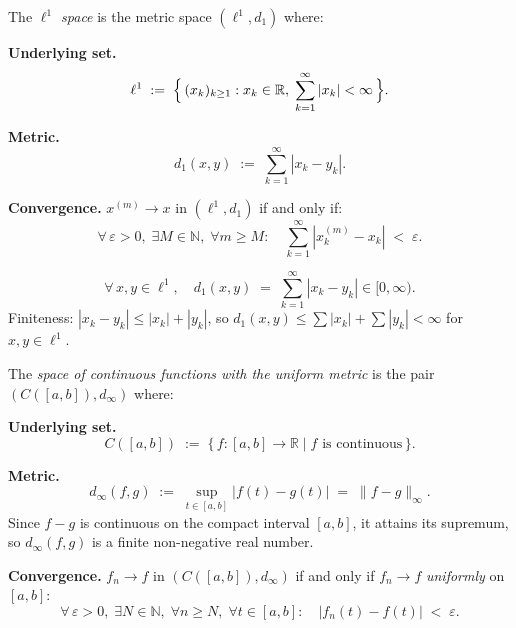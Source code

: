 \begin{tcolorbox}[colback=propbox, colframe=propborder, arc=2pt,
  left=6pt, right=6pt, top=4pt, bottom=4pt,
  title={\small\textbf{Definition ($\ell^1$ — Absolutely Summable Sequence Space)}},
  fonttitle=\small\bfseries]
\begin{definition}
\label{def:ell1}
The \emph{$\ell^1$ space} is the metric space $(\ell^1, d_1)$ where:

\medskip
\noindent\textbf{Underlying set.}
\[
\ell^1 \;:=\; \Bigl\{\,(x_k)_{k \ge 1} : x_k \in \mathbb{R},\;
\sum_{k=1}^\infty |x_k| < \infty\,\Bigr\}.
\]

\medskip
\noindent\textbf{Metric.}
\[
d_1(x,y) \;:=\; \sum_{k=1}^\infty |x_k - y_k|.
\]

\medskip
\noindent\textbf{Convergence.}\quad
$x^{(m)} \to x$ in $(\ell^1, d_1)$ if and only if:
\[
\forall\,\varepsilon > 0,\;\exists M \in \mathbb{N},\;
\forall m \ge M:\quad
\sum_{k=1}^\infty |x^{(m)}_k - x_k| \;<\; \varepsilon.
\]
\end{definition}
\end{tcolorbox}

\begin{remark*}
\[
\forall\, x, y \in \ell^1, \quad
d_1(x,y) \;=\; \sum_{k=1}^\infty |x_k - y_k| \in [0,\infty).
\]
Finiteness: $|x_k - y_k| \le |x_k| + |y_k|$, so
$d_1(x,y) \le \sum|x_k| + \sum|y_k| < \infty$ for $x, y \in \ell^1$.
\end{remark*}


\begin{tcolorbox}[colback=propbox, colframe=propborder, arc=2pt,
  left=6pt, right=6pt, top=4pt, bottom=4pt,
  title={\small\textbf{Definition ($C([a,b])$ with the Uniform Metric)}},
  fonttitle=\small\bfseries]
\begin{definition}
\label{def:cont-uniform}
The \emph{space of continuous functions with the uniform metric} is the pair
$(C([a,b]), d_\infty)$ where:

\medskip
\noindent\textbf{Underlying set.}
\[
C([a,b]) \;:=\; \bigl\{\,f : [a,b] \to \mathbb{R} \mid f \text{ is continuous}\,\bigr\}.
\]

\medskip
\noindent\textbf{Metric.}
\[
d_\infty(f,g) \;:=\; \sup_{t \in [a,b]}|f(t) - g(t)| \;=\; \|f - g\|_\infty.
\]
Since $f - g$ is continuous on the compact interval $[a,b]$, it attains
its supremum, so $d_\infty(f,g)$ is a finite non-negative real number.

\medskip
\noindent\textbf{Convergence.}\quad
$f_n \to f$ in $(C([a,b]), d_\infty)$ if and only if $f_n \to f$
\emph{uniformly} on $[a,b]$:
\[
\forall\,\varepsilon > 0,\;\exists N \in \mathbb{N},\;
\forall n \ge N,\;\forall t \in [a,b]:\quad
|f_n(t) - f(t)| \;<\; \varepsilon.
\]
\end{definition}
\end{tcolorbox}

